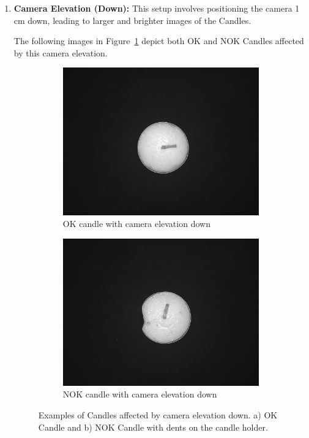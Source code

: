 \documentclass[12pt,DIV14,BCOR12mm,a4paper,footinclude=false,headinclude,parskip=half-,twoside,openright,cleardoublepage=empty,toc=index,bibliography=totoc,listof=totoc]{scrreprt}
\numberwithin{equation}{chapter}
\begin{document}
\begin{enumerate}
	\item \textbf{Camera Elevation (Down):} This setup involves positioning the camera 1 cm down, leading to larger and brighter images of the Candles. 

The following images in Figure~\ref{fig:camera_elevation_down} depict both OK and NOK Candles affected by this camera elevation.

	\begin{figure}
		\centering
		\begin{subfigure}[b]{0.45\textwidth}
			\centering
			\includegraphics[scale=0.15]{../media/Candles-influence-camera-down-OK.png}
			\caption{OK candle with camera elevation down}
		\end{subfigure}
		\hfill
		\begin{subfigure}[b]{0.45\textwidth}
			\centering
			\includegraphics[scale=0.15]{../media/Candles-influence-camera-down-NOK.png}
			\caption{NOK candle with camera elevation down}
		\end{subfigure}
		\caption{Examples of Candles affected by camera elevation down. a) OK Candle and b) NOK Candle with dents on the candle holder.}
		\label{fig:camera_elevation_down}
	\end{figure}
	

\end{enumerate}
\end{document}
